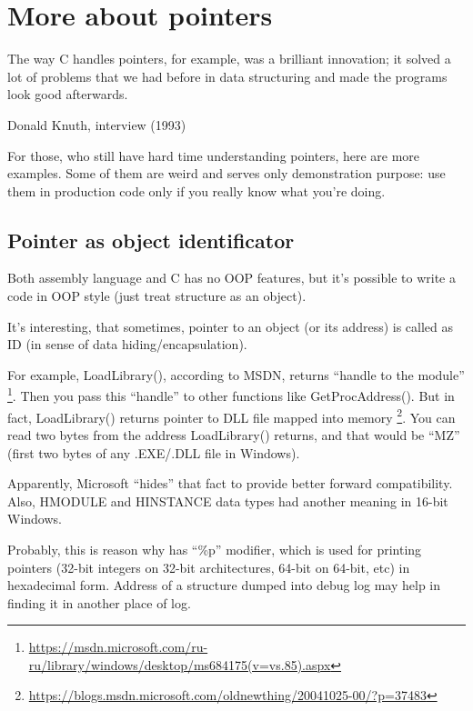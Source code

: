 \section{More about pointers}
\myindex{\CLanguageElements!\Pointers}
\label{label_pointers}

\epigraph{The way C handles pointers, for example, was a brilliant innovation;
it solved a lot of problems that we had before in data structuring and
made the programs look good afterwards.}{Donald Knuth, interview (1993)}

For those, who still have hard time understanding \CCpp pointers, here are more examples.
Some of them are weird and serves only demonstration purpose:
use them in production code only if you really know what you're doing.








\subsection{Pointer as object identificator}

Both assembly language and C has no \ac{OOP} features, but it's possible to write a code in \ac{OOP} style
(just treat structure as an object).

It's interesting, that sometimes, pointer to an object (or its address) is called as ID
(in sense of data hiding/encapsulation).

For example, LoadLibrary(), according to \ac{MSDN}, returns ``handle to the module''
\footnote{\url{https://msdn.microsoft.com/ru-ru/library/windows/desktop/ms684175(v=vs.85).aspx}}.
Then you pass this ``handle'' to other functions like GetProcAddress().
But in fact, LoadLibrary() returns pointer to DLL file mapped into memory
\footnote{\url{https://blogs.msdn.microsoft.com/oldnewthing/20041025-00/?p=37483}}.
You can read two bytes from the address LoadLibrary() returns, and that would be ``MZ'' (first two bytes of any
.EXE/.DLL file in Windows).

Apparently, Microsoft ``hides'' that fact to provide better forward compatibility.
Also, HMODULE and HINSTANCE data types had another meaning in 16-bit Windows.

Probably, this is reason why \printf has ``\%p'' modifier, which is used for printing pointers (32-bit integers
on 32-bit architectures, 64-bit on 64-bit, etc) in hexadecimal form.
Address of a structure dumped into debug log may help in finding it in another place of log.


